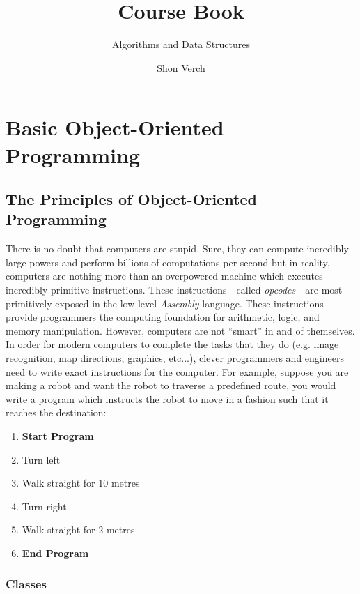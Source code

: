 \documentclass{concrete-book}
\title{Course Book}
\subtitle{Algorithms and Data Structures}
\author{Shon Verch}
\begin{document}
\frontmatter
\maketitle

\tableofcontents
\cleardoublepage
\mainmatter

\part{Basic Object-Oriented Programming}

\chapter{The Principles of Object-Oriented Programming}
There is no doubt that computers are stupid. Sure, they can compute incredibly large powers and perform billions of 
computations per second but in reality, computers are nothing more than an overpowered machine which executes
incredibly primitive instructions. These instructions---called \textit{opcodes}---are most primitively exposed 
in the low-level \textit{Assembly} language. These instructions provide 
programmers the computing foundation for arithmetic, logic, and memory manipulation. However, computers are not ``smart''
in and of themselves. In order for modern computers to complete the tasks that they do (e.g. image recognition,
map directions, graphics, etc...), clever programmers and engineers need to write exact instructions for the computer.
For example, suppose you are making a robot and want the robot to traverse a predefined route, you would write a program which instructs
the robot to move in a fashion such that it reaches the destination:

\begin{enumerate}
    \item \textbf{Start Program}
    \item Turn left
    \item Walk straight for 10 metres
    \item Turn right
    \item Walk straight for 2 metres
    \item \textbf{End Program}
\end{enumerate}

\section{Classes}
\end{document}
